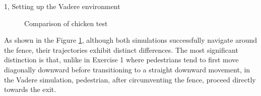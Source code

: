 \begin{task}{1, Setting up the Vadere environment}
\begin{figure}[H] 
\centering
{}
\caption{Comparison of chicken test}
\label{chicken-test}
\end{figure}

As shown in the Figure \ref{chicken-test}, although both simulations successfully navigate around the fence, their trajectories exhibit distinct differences. The most significant distinction is that, unlike in Exercise 1 where pedestrians tend to first move diagonally downward before transitioning to a straight downward movement, in the Vadere simulation, pedestrian, after circumventing the fence, proceed directly towards the exit.


\end{task}

